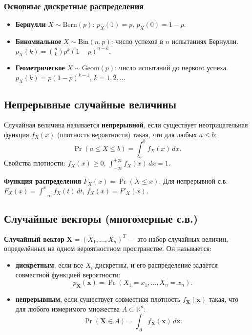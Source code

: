 \documentclass[10pt]{article}
\begin{document}
\subsubsection*{Основные дискретные распределения}
\begin{itemize}
    \item \textbf{Бернулли} $X \sim \text{Bern}(p)$: $p_X(1)=p$, $p_X(0)=1-p$.
    \item \textbf{Биномиальное} $X \sim \text{Bin}(n, p)$: число успехов в $n$ испытаниях Бернулли. $p_X(k) = \binom{n}{k} p^k (1-p)^{n-k}$.
    \item \textbf{Геометрическое} $X \sim \text{Geom}(p)$: число испытаний до первого успеха. $p_X(k) = p(1-p)^{k-1}$, $k=1,2,\dots$
\end{itemize}

\subsection{Непрерывные случайные величины}
Случайная величина называется \textbf{непрерывной}, если существует неотрицательная функция $f_X(x)$ (плотность вероятности) такая, что для любых $a \le b$:
\[
\Pr(a \le X \le b) = \int_{a}^{b} f_X(x) \, dx.
\]
Свойства плотности: $f_X(x) \ge 0$, $\int_{-\infty}^{+\infty} f_X(x) \, dx = 1$.

\begin{definition}
\textbf{Функция распределения} $F_X(x) = \Pr(X \le x)$. Для непрерывной с.в. $F_X(x) = \int_{-\infty}^{x} f_X(t) \, dt$, $f_X(x) = F'_X(x)$.
\end{definition}

\subsection{Случайные векторы (многомерные с.в.)}
\begin{definition}
\textbf{Случайный вектор} $\mathbf{X} = (X_1, \dots, X_n)^T$ — это набор случайных величин, определённых на одном вероятностном пространстве. Он называется:
\begin{itemize}
    \item \textbf{дискретным}, если все $X_i$ дискретны, и его распределение задаётся совместной функцией вероятности:
    \[
    p_{\mathbf{X}}(\mathbf{x}) = \Pr(X_1 = x_1, \dots, X_n = x_n).
    \]
    \item \textbf{непрерывным}, если существует совместная плотность $f_{\mathbf{X}}(\mathbf{x})$ такая, что для любого измеримого множества $A \subset \mathbb{R}^n$:
    \[
    \Pr(\mathbf{X} \in A) = \int_A f_{\mathbf{X}}(\mathbf{x}) \, d\mathbf{x}.
    \]
\end{itemize}
\end{definition}
\end{document}
